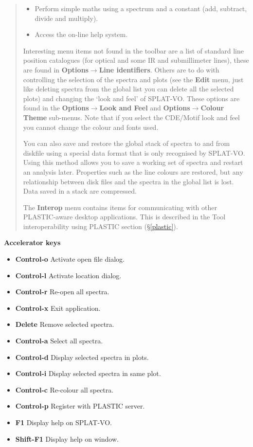 \documentclass[twoside,11pt]{article}
\newcommand{\htmladdimg}[1]{}
\newcommand{\htmlref}[2]{#1}
\newcommand{\latex}[1]{#1}
\newcommand{\latexhtml}[2]{#1}
\renewcommand{\_}{\texttt{\symbol{95}}}
\newcommand{\SPLAT}{\textsf{SPLAT-VO}}
\newcommand{\inline}[1]
        {\latexhtml{\texttt{[image: sun243\_figures/\#1.eps]}}
        {\htmladdimg[align=center]{#1.gif}}}
\newcommand{\menuitem}[1]{\textbf{#1}}
\newcommand{\submenuitem}[2]{\latexhtml{\textbf{#1$\rightarrow$#2}}{\textbf{#1->#2}}}
\newcommand{\labelitem}[1]{\textbf{#1}}
\newcommand{\subheading}[1]{\textbf{\large{#1}}}
\begin{document}
\begin{quote}
\begin{itemize}
  \item[\inline{unarymaths}] Perform simple maths using a spectrum and a
  constant (add, subtract, divide and multiply).

  \item[\inline{help}] Access the on-line help system.

\end{itemize}

 Interesting menu items not found in the toolbar are a list of standard line
 position catalogues (for optical and some IR and submillimeter lines), these
 are found in \submenuitem{Options}{Line identifiers}.  Others are to do with
 controlling the selection of the spectra and plots (see the \menuitem{Edit}
 menu, just like deleting spectra from the global list you can delete all the
 selected plots) and changing the `look and feel' of \SPLAT. These options are
 found in the \submenuitem{Options}{Look and Feel} and
 \submenuitem{Options}{Colour Theme} sub-menus. Note that if you select the
 CDE/Motif look and feel you cannot change the colour and fonts used.

 You can also save and restore the global stack of spectra to and from
 diskfile using a special data format that is only recognised by \SPLAT.
 Using this method allows you to save a working set of spectra and restart an
 analysis later. Properties such as the line colours are restored, but any
 relationship between disk files and the spectra in the global list is
 lost. Data saved in a stack are compressed.

 The \menuitem{Interop} menu contains items for communicating with other 
 PLASTIC-aware desktop applications. This is described in the 
 \htmlref{Tool interoperability using PLASTIC}{plastic} section
 \latex{(\S\ref{plastic})}.

\end{quote}

\subheading{Accelerator keys}

\begin{itemize}
\item \labelitem{Control-o} Activate open file dialog.
\item \labelitem{Control-l} Activate location dialog.
\item \labelitem{Control-r} Re-open all spectra.
\item \labelitem{Control-x} Exit application.
\item \labelitem{Delete} Remove selected spectra.
\item \labelitem{Control-a} Select all spectra.
\item \labelitem{Control-d} Display selected spectra in plots.
\item \labelitem{Control-i} Display selected spectra in same plot.
\item \labelitem{Control-c} Re-colour all spectra.
\item \labelitem{Control-p} Register with PLASTIC server.
\item \labelitem{F1} Display help on \SPLAT.     
\item \labelitem{Shift-F1} Display help on window.
\end{itemize}
\end{document}

